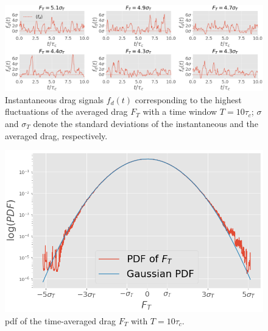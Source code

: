 \documentclass{jfm}
\newcommand{\QQ}[1]{{\color{green}{#1}}}
\begin{document}
\begin{figure}
	\centering
	\includegraphics[width=\linewidth]{timeseries_extrms_AVG/timeseries_extrms_AVG}
	\caption{Instantaneous drag signals $f_d(t)$ corresponding to the highest fluctuations of the averaged  drag $F_T$ with a time window $T = 10 \tau_c$;  $\sigma$ and $\sigma_T$ denote the standard deviations of the instantaneous and the averaged drag, respectively.}
	\label{fig:extreme_avg}
\end{figure}

\begin{figure}
	\centering
	\includegraphics[width=.7\linewidth]{PDF_AVG/PDF_AVG}
	\caption{\ac{pdf} of the time-averaged drag $F_T$ with $T = 10\tau_c$. 
				\QQ{x-axis should be $x = F_T$ and y-axis $P(x)$ in agreement with Fig. 4(a). Gaussian PDF should be replaced by Gaussian estimate for the same reason. No need to mention PDF of $F_T$.}
	}
	\label{fig:PDF_AVG}
\end{figure}

%
\end{document}
